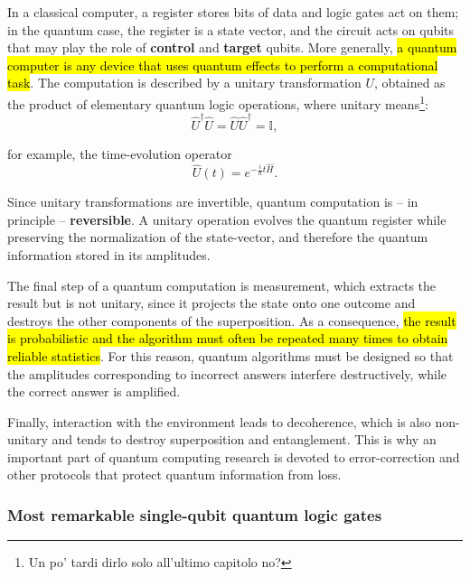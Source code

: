 In a classical computer, a register stores bits of data and logic gates act on them; in the quantum case, the register is a state vector, and the circuit acts on qubits that may play the role of \textbf{control} and \textbf{target} qubits. More generally, \hl{a quantum computer is any device that uses quantum effects to perform a computational task}. The computation is described by a unitary transformation $U$, obtained as the product of elementary quantum logic operations, where unitary means\footnote{Un po' tardi dirlo solo all'ultimo capitolo no?}:
\begin{equation}\label{eqn:16-unitary-operator}
\hat{U}^\dagger \hat{U} = \hat{U}\hat{U}^\dagger = \mathbb{I},
\end{equation}

for example, the time-evolution operator
\begin{equation}\label{eqn:16-time-evolution-operator}
\hat{U}(t)=e^{-\frac{i}{\hbar}t\hat{H}}.
\end{equation}

Since unitary transformations are invertible, quantum computation is -- in principle -- \textbf{reversible}. A unitary operation evolves the quantum register while preserving the normalization of the state-vector, and therefore the quantum information stored in its amplitudes. 

The final step of a quantum computation is measurement, which extracts the result but is not unitary, since it projects the state onto one outcome and destroys the other components of the superposition. As a consequence, \hl{the result is probabilistic and the algorithm must often be repeated many times to obtain reliable statistics}. For this reason, quantum algorithms must be designed so that the amplitudes corresponding to incorrect answers interfere destructively, while the correct answer is amplified.

Finally, interaction with the environment leads to decoherence, which is also non-unitary and tends to destroy superposition and entanglement. This is why an important part of quantum computing research is devoted to error-correction and other protocols that protect quantum information from loss.

\subsubsection{Most remarkable single-qubit quantum logic gates}

